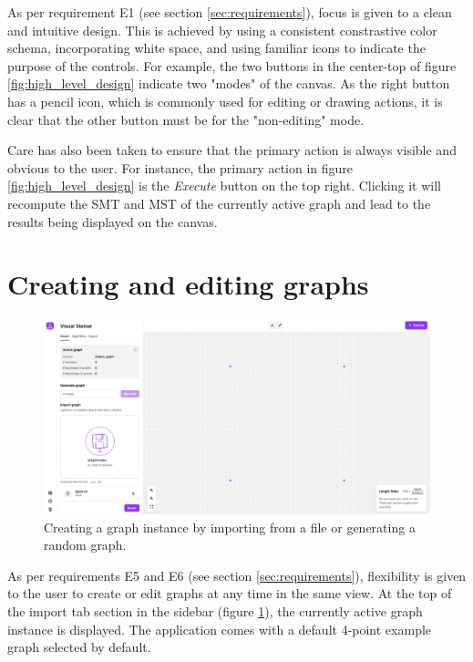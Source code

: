 \documentclass{l4proj}
\begin{document}
As per requirement E1 (see section \ref{sec:requirements}), focus is given to a clean and intuitive design. This is achieved by using a consistent constrastive color schema, incorporating white space, and using familiar icons to indicate the purpose of the controls.
For example, the two buttons in the center-top of figure \ref{fig:high_level_design} indicate two "modes" of the canvas. As the right button has a pencil icon, which is commonly used for editing or drawing actions, it is clear that the other button must be for the "non-editing" mode.

Care has also been taken to ensure that the primary action is always visible and obvious to the user. For instance, the primary action in figure \ref{fig:high_level_design} is the \textit{Execute} button on the top right. Clicking it will recompute the SMT and MST of the currently active graph and lead to the results being displayed on the canvas.
\section{Creating and editing graphs}
\label{sec:creating_and_editing_graphs}

\begin{figure}[hp]
    \centering
    \begin{tcolorbox}[colframe=gray!20, colback=gray!5, boxrule=1pt, arc=0mm, boxsep=0pt, left=0pt, right=0pt, top=0pt, bottom=0pt]
        \includegraphics[width=\textwidth]{images/import_view.png}
    \end{tcolorbox}

    \caption{Creating a graph instance by importing from a file or generating a random graph.}
    \label{fig:creating_and_editing_graphs}
\end{figure}
As per requirements E5 and E6 (see section \ref{sec:requirements}), flexibility is given to the user to create or edit graphs at any time in the same view.
At the top of the import tab section in the sidebar (figure \ref{fig:creating_and_editing_graphs}), the currently active graph instance is displayed.
The application comes with a default 4-point example graph selected by default.
\end{document}
